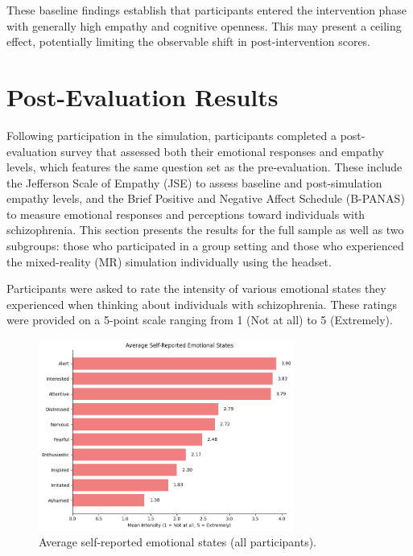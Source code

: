 These baseline findings establish that participants entered the intervention phase with generally high empathy and cognitive openness. This may present a ceiling effect, potentially limiting the observable shift in post-intervention scores.

\section{Post-Evaluation Results}

Following participation in the simulation, participants completed a post-evaluation survey that assessed both their emotional responses and empathy levels, which features the same question set as the pre-evaluation. These include the Jefferson Scale of Empathy (JSE) \cite{Hojat2002} to assess baseline and post-simulation empathy levels, and the Brief Positive and Negative Affect Schedule (B-PANAS) \cite{Boiroux2024} to measure emotional responses and perceptions toward individuals with schizophrenia. This section presents the results for the full sample as well as two subgroups: those who participated in a group setting and those who experienced the mixed-reality (MR) simulation individually using the headset.

Participants were asked to rate the intensity of various emotional states they experienced when thinking about individuals with schizophrenia. These ratings were provided on a 5-point scale ranging from 1 (Not at all) to 5 (Extremely).

\begin{figure}[H]
    \centering
    \includegraphics[width=0.75\textwidth]{../../Figures/emotional-post-all.png}
    \caption{Average self-reported emotional states (all participants).}
    \label{fig:emotional_post_all}
\end{figure}

